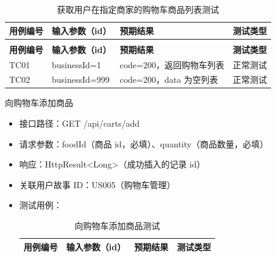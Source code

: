 \begin{levellist}
\begin{levellist}
\begin{itemize}
\begin{longtable}{>{\centering\arraybackslash}m{1.7cm} >{\centering\arraybackslash}m{3cm} >{\centering\arraybackslash}m{6.3cm} >{\centering\arraybackslash}m{2cm}}
                      \caption{获取用户在指定商家的购物车商品列表测试} \label{tab:training}                     \\

                      \toprule
                      \textbf{用例编号} & \textbf{输入参数（id）} & \textbf{预期结果}      & \textbf{测试类型} \\
                      \midrule
                      \endfirsthead

                      \multicolumn{4}{c}{{\tablename\ \thetable{} 续表}}                       \\
                      \toprule
                      \textbf{用例编号} & \textbf{输入参数（id）} & \textbf{预期结果}      & \textbf{测试类型} \\
                      \midrule
                      \endhead

                      \bottomrule
                      \endfoot

                      TC01          & businessId=1      & code=200，返回购物车列表   & 正常测试          \\
                      TC02          & businessId=999    & code=200，data 为空列表 & 正常测试          \\
                  \end{longtable}
        \end{itemize}

        \item 向购物车添加商品
        \begin{itemize}
            \item 接口路径：GET /api/carts/add
            \item 请求参数：foodId（商品 id，必填）、quantity（商品数量，必填）
            \item 响应：HttpResult<Long>（成功插入的记录 id）
            \item 关联用户故事 ID：US005（购物车管理）
            \item 测试用例：
                  \begin{longtable}{>{\centering\arraybackslash}m{1.7cm} >{\centering\arraybackslash}m{3cm} >{\centering\arraybackslash}m{6.3cm} >{\centering\arraybackslash}m{2cm}}

                      \caption{向购物车添加商品测试} \label{tab:training}                                       \\

                      \toprule
                      \textbf{用例编号} & \textbf{输入参数（id）}      & \textbf{预期结果}          & \textbf{测试类型} \\
                      \midrule
                      \endfirsthead


\end{longtable}
\end{itemize}
\end{levellist}
\end{levellist}
